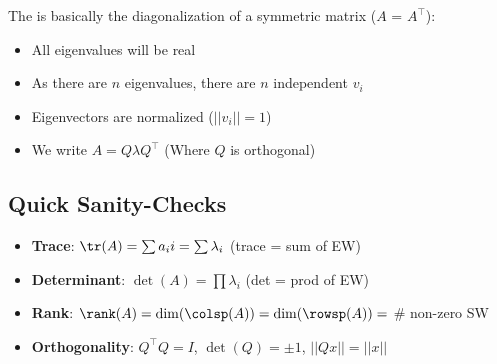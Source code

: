The  is basically the diagonalization
of a symmetric matrix ($A$ = $A^\top$):
\begin{itemize}
    \item All eigenvalues will be real 
    \item As there are $n$ eigenvalues, there are $n$ independent $v_i$
    \item Eigenvectors are normalized ($||v_i|| = 1$)
    \item We write $A = Q\lambda Q^\top$ (Where $Q$ is orthogonal)
\end{itemize}

\subsection{Quick Sanity-Checks}
\begin{itemize}
    \item \textbf{Trace}: $\tr(A) = \sum a_ii = \sum \lambda_i$ (trace = sum of EW)
    \item \textbf{Determinant}: $\det(A) = \prod \lambda_i$ (det = prod of EW)
    \item \textbf{Rank}: $\rank(A) = \dim(\colsp(A)) = \dim(\rowsp(A)) = $ \# non-zero SW
    \item \textbf{Orthogonality}: $Q^\top Q = I$, $\det(Q) = \pm 1$, $||Qx|| = ||x||$
\end{itemize}

